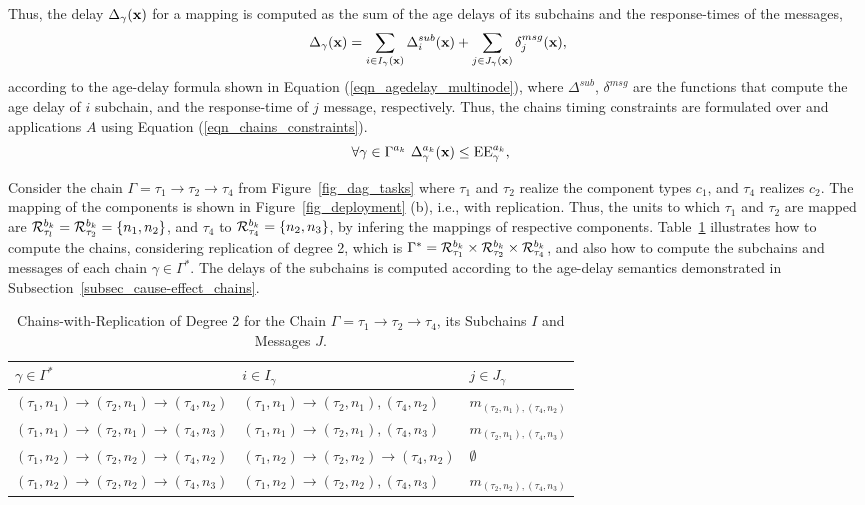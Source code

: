Thus, the delay $\Delta_\gamma(\textbf{x})$ for a mapping \ttx is computed as the sum of the age delays of its subchains and the response-times of the messages,
\[
	\Delta_{\gamma}(\textbf{x})=\sum_{i\in I_{\gamma}(\textbf{x})}{\Delta^{sub}_{i}(\textbf{x})} + \sum_{j\in J_{\gamma}(\textbf{x})}{\delta^{msg}_j(\textbf{x})},
\]
according to the age-delay formula shown in Equation (\ref{eqn_agedelay_multinode}), where $\Delta^{sub}$, $\delta^{msg}$ are the functions that compute the age delay of $i$ subchain, and the response-time of $j$ message, respectively. Thus, the chains timing constraints are formulated over \ttx and applications $A$ using Equation (\ref{eqn_chains_constraints}).
\begin{align}
\label{eqn_chains_constraints}
\forall \gamma \in \ssp{\Gamma} \ \sss{\Delta}[k][{\gamma}](\x) & \leq \sss{\mathrm{EE}}[k][\gamma],
\end{align}
\begin{example} Consider the chain $\Gamma=\tau_1\rightarrow\tau_2\rightarrow\tau_4$ from Figure~\ref{fig_dag_tasks} where $\tau_1$ and $\tau_2$ realize the component types $c_1$, and $\tau_4$ realizes $c_2$. The mapping of the components is shown in Figure~\ref{fig_deployment} (b), i.e., with replication. Thus, the units to which $\tau_1$ and $\tau_2$ are mapped are $\sss{\mathcal{R}}[k][\tau_l][b]=\sss{\mathcal{R}}[k][\tau_2][b]=\{n_1,n_2\}$, and $\tau_4$ to $\sss{\mathcal{R}}[k][\tau_4][b]=\{n_2,n_3\}$, by infering the mappings of respective components. Table~\ref{tbl_chains_with_replication} illustrates how to compute the chains, considering replication of degree 2, which is $\Gamma^* = \sss{\mathcal{R}}[k][\tau_1][b] \times \sss{\mathcal{R}}[k][\tau_2][b] \times \sss{\mathcal{R}}[k][\tau_4][b]$, and also how to compute the subchains and messages of each chain $\gamma\in \Gamma^*$. The delays of the subchains is computed according to the age-delay semantics demonstrated in Subsection~\ref{subsec_cause-effect_chains}.
\end{example} 
\begin{table}[]
	\begin{tabular}{@{}lll@{}}
		\toprule
		$\gamma\in \Gamma^*$ & $i\in I_\gamma$ & $j\in J_\gamma$ \\ \midrule
		$(\tau_1,n_1)\rightarrow (\tau_2,n_1)\rightarrow(\tau_4,n_2)$ & $(\tau_1,n_1)\rightarrow (\tau_2,n_1),(\tau_4,n_2)$ & $m_{(\tau_2,n_1), (\tau_4,n_2)}$ \\
		$(\tau_1,n_1)\rightarrow (\tau_2,n_1)\rightarrow(\tau_4,n_3)$ & $(\tau_1,n_1)\rightarrow (\tau_2,n_1),(\tau_4,n_3)$ & $m_{(\tau_2,n_1), (\tau_4,n_3)}$ \\
		$(\tau_1,n_2)\rightarrow(\tau_2,n_2)\rightarrow(\tau_4,n_2)$ & $(\tau_1,n_2)\rightarrow(\tau_2,n_2)\rightarrow(\tau_4,n_2)$ & $\emptyset$ \\
		$(\tau_1,n_2)\rightarrow(\tau_2,n_2)\rightarrow(\tau_4,n_3)$ & $(\tau_1,n_2)\rightarrow(\tau_2,n_2),(\tau_4,n_3)$ & $m_{(\tau_2,n_2), (\tau_4,n_3)}$ \\ \bottomrule
	\end{tabular}
\caption{Chains-with-Replication of Degree 2 for the Chain $\Gamma=\tau_1\rightarrow\tau_2\rightarrow\tau_4$, its Subchains $I$ and Messages $J$.}
\label{tbl_chains_with_replication}
\end{table}

